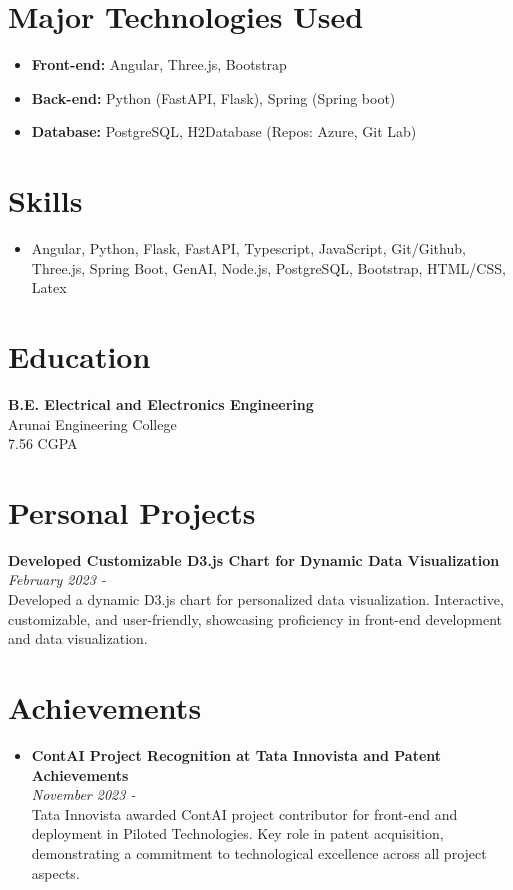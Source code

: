\documentclass[letterpaper,10pt]{article}
\begin{document}
\begin{multicols}{2}
\section*{Major Technologies Used}
\begin{itemize}
    \item \textbf{Front-end:} Angular, Three.js, Bootstrap
    \item \textbf{Back-end:} Python (FastAPI, Flask), Spring (Spring boot)
    \item \textbf{Database:} PostgreSQL, H2Database (Repos: Azure, Git Lab)
\end{itemize}

\section*{Skills}
\begin{itemize}
    \item Angular, Python, Flask, FastAPI, Typescript, JavaScript, Git/Github, Three.js, Spring Boot, GenAI, Node.js, PostgreSQL, Bootstrap, HTML/CSS, Latex
\end{itemize}

\section*{Education}
\textbf{B.E. Electrical and Electronics Engineering} \\
Arunai Engineering College \\
7.56 CGPA

\section*{Personal Projects}
\textbf{Developed Customizable D3.js Chart for Dynamic Data Visualization} \\
\textit{February 2023 -} \\
Developed a dynamic D3.js chart for personalized data visualization. Interactive, customizable, and user-friendly, showcasing proficiency in front-end development and data visualization.

\section*{Achievements}
\begin{itemize}
    \item \textbf{ContAI Project Recognition at Tata Innovista and Patent Achievements} \\
    \textit{November 2023 -} \\
    Tata Innovista awarded ContAI project contributor for front-end and deployment in Piloted Technologies. Key role in patent acquisition, demonstrating a commitment to technological excellence across all project aspects.
    

\end{itemize}
\end{multicols}
\end{document}

